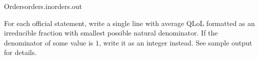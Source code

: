 \begin{problem}{Orders}{orders.in}{orders.out}
\OutputFile

For each official statement, write a single line with average QLoL formatted
as an irreducible fraction with smallest possible natural denominator.
If the denominator of some value is $1$, write it as an integer instead.
See sample output for details.

\Example
\begin{example}
%
\end{example}

\end{problem}
